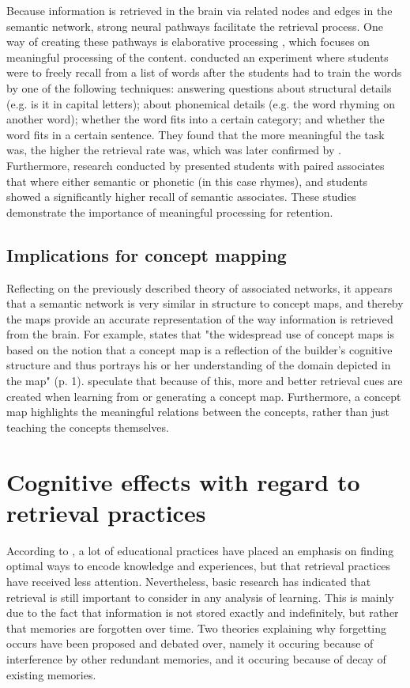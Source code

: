 Because information is retrieved in the brain via related nodes and edges in the semantic network, strong neural pathways facilitate the retrieval process. One way of creating these pathways is elaborative processing \cite{karpicke4, cognitivepsychology}, which focuses on meaningful processing of the content.  conducted an experiment where students were to freely recall from a list of words after the students had to train the words by one of the following techniques: answering questions about structural details (e.g. is it in capital letters); about phonemical details (e.g. the word rhyming on another word); whether the word fits into a certain category; and whether the word fits in a certain sentence. They found that the more meaningful the task was, the higher the retrieval rate was, which was later confirmed by . Furthermore, research conducted by  presented students with paired associates that where either semantic or phonetic (in this case rhymes), and students showed a significantly higher recall of semantic associates. These studies demonstrate the importance of meaningful processing for retention.

\subsection{Implications for concept mapping}

Reflecting on the previously described theory of associated networks, it appears that a semantic network is very similar in structure to concept maps, and thereby the maps provide an accurate representation of the way information is retrieved from the brain. For example,  states that "the widespread use of concept maps is based on the notion that a concept map is a reflection of the builder's cognitive structure and thus portrays his or her understanding of the domain depicted in the map" (p. 1).  speculate that because of this, more and better retrieval cues are created when learning from or generating a concept map. Furthermore, a concept map highlights the meaningful relations between the concepts, rather than just teaching the concepts themselves.

\section{Cognitive effects with regard to retrieval practices}

According to , a lot of educational practices have placed an emphasis on finding optimal ways to encode knowledge and experiences, but that retrieval practices have received less attention. Nevertheless, basic research has indicated that retrieval is still important to consider in any analysis of learning. This is mainly due to the fact that information is not stored exactly and indefinitely, but rather that memories are forgotten over time. Two theories explaining why forgetting occurs have been proposed and debated over, namely it occuring because of interference by other redundant memories, and it occuring because of decay of existing memories.

